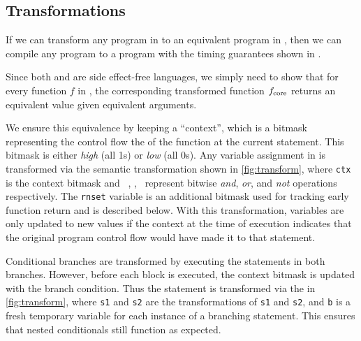 \subsection{Transformations}

If we can transform any program in \constc to an equivalent program in \ccore, then
we can compile any \constc program to a program with the timing guarantees shown in \ccore.

Since both \ccore
and \constc are side effect-free languages, we simply need to show that for
every function $f$ in \constc, the corresponding transformed function
$f_{\textnormal{core}}$ returns an equivalent value given equivalent arguments.

We ensure this equivalence by keeping a ``context'', which is a bitmask
representing the control flow the of the function at the current statement.
This bitmask is either \emph{high} (all 1s) or \emph{low} (all 0s). 
Any variable assignment
in \constc is transformed
via the semantic transformation  shown in \autoref{fig:transform},
where \texttt{ctx} is the context bitmask and ~\band, \bor, \bnot\ represent
bitwise \emph{and}, \emph{or}, and \emph{not} operations respectively.
The \texttt{rnset}
variable is an additional bitmask used for tracking early function return and
is described below.  With this transformation, variables are only updated to
new values if the context at the time of execution indicates that the original
program control flow would have made it to that statement.

Conditional branches are transformed by executing the statements in both
branches. However, before each block is executed, the context bitmask is
updated with the branch condition. Thus the statement
is transformed via the  in \autoref{fig:transform},
where \texttt{\textlangle{}s1\textrangle} and \texttt{\textlangle{}s2\textrangle} are the transformations of \texttt{s1} and \texttt{s2}, and \texttt{b} is a fresh temporary variable for each instance of a branching
statement. This ensures that nested conditionals still function as expected.

